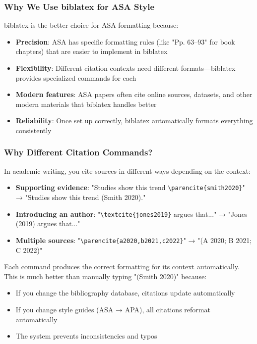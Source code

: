\documentclass[11pt,a4paper]{ltxdoc}
\begin{document}
\subsubsection{Why We Use biblatex for ASA Style}

\textsf{biblatex} is the better choice for ASA formatting because:

\begin{itemize}
  \item \textbf{Precision}: ASA has specific formatting rules (like "Pp. 63–93" for book chapters) that are easier to implement in biblatex
  \item \textbf{Flexibility}: Different citation contexts need different formats—biblatex provides specialized commands for each
  \item \textbf{Modern features}: ASA papers often cite online sources, datasets, and other modern materials that biblatex handles better
  \item \textbf{Reliability}: Once set up correctly, biblatex automatically formats everything consistently
\end{itemize}

\subsubsection{Why Different Citation Commands?}

In academic writing, you cite sources in different ways depending on the context:

\begin{itemize}
  \item \textbf{Supporting evidence}: "Studies show this trend \texttt{\textbackslash parencite\{smith2020\}}" → "Studies show this trend (Smith 2020)."
  \item \textbf{Introducing an author}: "\texttt{\textbackslash textcite\{jones2019\}} argues that..." → "Jones (2019) argues that..."
  \item \textbf{Multiple sources}: "\texttt{\textbackslash parencite\{a2020,b2021,c2022\}}" → "(A 2020; B 2021; C 2022)"
\end{itemize}

Each command produces the correct formatting for its context automatically. This is much better than manually typing "(Smith 2020)" because:
\begin{itemize}
  \item If you change the bibliography database, citations update automatically
  \item If you change style guides (ASA → APA), all citations reformat automatically  
  \item The system prevents inconsistencies and typos
\end{itemize}
\end{document}
